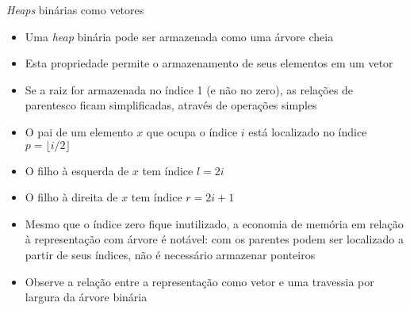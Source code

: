 \begin{frame}[fragile]{\textit{Heaps} binárias como vetores}

    \begin{itemize}
        \item Uma \textit{heap} binária pode ser armazenada como uma árvore cheia

        \item Esta propriedade permite o armazenamento de seus elementos em um vetor

        \item Se a raiz for armazenada no índice 1 (e não no zero), as relações de parentesco
            ficam simplificadas, através de operações simples

        \item O pai de um elemento $x$ que ocupa o índice $i$ está localizado no índice 
            $p = \lfloor i/2\rfloor$

        \item O filho à esquerda de $x$ tem índice $l = 2i$
        \item O filho à direita  de $x$ tem índice $r = 2i + 1$

        \item Mesmo que o índice zero fique inutilizado, a economia de memória em relação à 
            representação com árvore é notável: com os parentes podem ser localizado a partir
            de seus índices, não é necessário armazenar ponteiros

        \item Observe a relação entre a representação como vetor e uma travessia por largura
            da árvore binária
    \end{itemize}

\end{frame}

